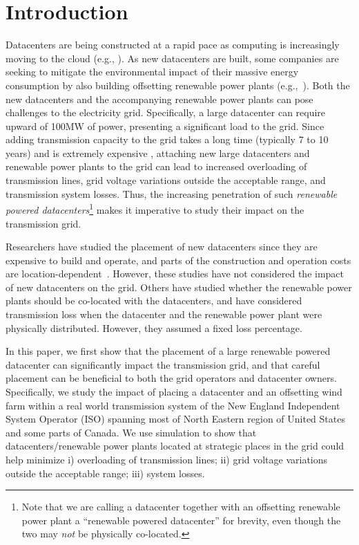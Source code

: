 \section{Introduction}
\label{sec:intro}

Datacenters are being constructed at a rapid pace as computing is increasingly moving to the cloud (e.g., \cite{RM14DCGrowth}).  As new datacenters are built, some companies are seeking to mitigate the environmental impact of their massive energy consumption by also building offsetting renewable power plants (e.g.,~\cite{GoogleGreen,Apple13,McGrawHill11}).  Both the new datacenters and the accompanying renewable power plants can pose challenges to the electricity grid.  Specifically, a large datacenter can require upward of 100MW of power, presenting a significant load to the grid.  Since adding transmission capacity to the grid takes a long time (typically 7 to 10 years) and is extremely expensive \cite{interconnection2010survey}, attaching new large datacenters and renewable power plants to the grid can lead to increased overloading of transmission lines, grid voltage variations outside the acceptable range, and transmission system losses.  Thus, the increasing penetration of such {\em renewable powered datacenters}\footnote{Note that we are calling a datacenter together with an offsetting renewable power plant a ``renewable powered datacenter'' for brevity, even though the two may {\em not} be physically co-located.} makes it imperative to study their impact on the transmission grid.

Researchers have studied the placement of new datacenters since they are expensive to build and operate, and parts of the construction and operation costs are location-dependent~\cite{Goiri11place,Dalger05,Boley09,larumbe2012optimal,berral2014building}.  However, these studies have not considered the impact of new datacenters on the grid.  Others have studied whether the renewable power plants should be co-located with the datacenters\cite{Ren12MASCOTS}, and have considered transmission loss when the datacenter and the renewable power plant were physically distributed.  However, they assumed a fixed loss percentage.

In this paper, we first show that the placement of a large renewable powered datacenter can significantly impact the transmission grid, and that careful placement can be beneficial to both the grid operators and datacenter owners.  Specifically, we study the impact of placing a datacenter and an offsetting wind farm within a real world transmission system of the New England Independent System Operator (ISO) spanning most of North Eastern region of United States and some parts of Canada.  We use simulation to show that datacenters/renewable power plants located at strategic places in the grid could help minimize i) overloading of transmission lines; ii) grid voltage variations outside the acceptable range; iii) system losses.


